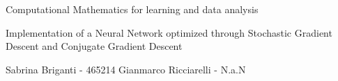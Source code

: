 

Computational Mathematics for learning and data analysis

Implementation of a Neural Network optimized through Stochastic Gradient Descent and Conjugate Gradient Descent

Sabrina Briganti - 465214
Gianmarco Ricciarelli - N.a.N